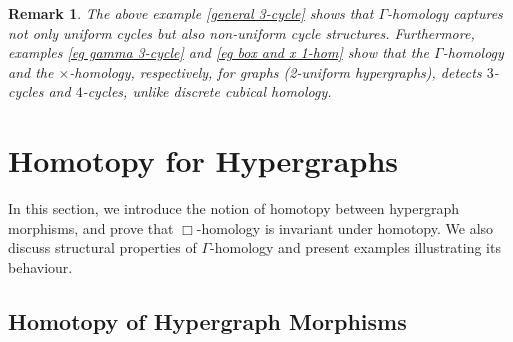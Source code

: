 \documentclass[10pt,a4paper]{amsart}
\newtheorem{rem}[subsection]{Remark}
\newtheorem{prop}[subsection]{Proposition}
\begin{document}
\begin{rem}
The above example \ref{general 3-cycle} shows that $\Gamma$-homology captures not only uniform cycles but also non-uniform cycle structures. Furthermore,  examples \ref{eg gamma 3-cycle} and \ref{eg box and x 1-hom} show that the $\Gamma$-homology and the $\times$-homology, respectively, for graphs (2-uniform hypergraphs), detects $3$-cycles and $4$-cycles, unlike discrete cubical homology. 
\end{rem}


\section{Homotopy for Hypergraphs}\label{hmtpy}

In this section, we introduce the notion of homotopy between hypergraph morphisms, and prove that $\Box$-homology is invariant under homotopy. We also discuss structural properties of $\Gamma$-homology and present examples illustrating its behaviour.




\subsection{Homotopy of Hypergraph Morphisms}
\end{document}
